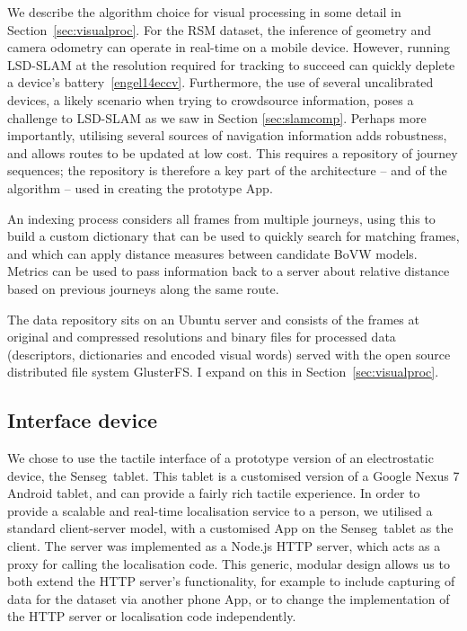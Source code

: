 We describe the algorithm choice for visual processing in some detail in Section~\ref{sec:visualproc}.  For the RSM dataset, the inference of geometry and camera odometry can operate in real-time on a mobile device. However, running LSD-SLAM at the resolution required for tracking to succeed can quickly deplete a device's battery~\ref{engel14eccv}.  Furthermore, the use of several uncalibrated devices, a likely scenario when trying to crowdsource information, poses a challenge to LSD-SLAM as we saw in Section \ref{sec:slamcomp}. Perhaps more importantly, utilising several sources of navigation information adds robustness, and allows routes to be updated at low cost. This requires a repository of journey sequences; the repository is therefore a key part of the architecture -- and of the algorithm -- used in creating the prototype App. 

An indexing process considers all frames from multiple journeys, using this to build a custom dictionary that can be used to quickly search for matching frames, and which can apply distance measures between candidate BoVW models. Metrics can be used to pass information back to a server about relative distance based on previous journeys along the same route. 

The data repository sits on an Ubuntu server and consists of the frames at original and compressed resolutions and binary files for processed data (descriptors, dictionaries and encoded visual words) served with the open source distributed file system GlusterFS. I expand on this in Section~\ref{sec:visualproc}. 

\subsection{Interface device} We chose to use the tactile interface of a prototype version of an electrostatic device, the Senseg\texttrademark\ tablet. This tablet is a customised version of a Google Nexus 7 Android tablet, and can provide a fairly rich tactile experience. In order to provide a scalable and real-time localisation service to a person, we utilised a standard client-server model, with a customised App on the Senseg\texttrademark\ tablet as the client. The server was implemented as a Node.js HTTP server, which acts as a proxy for calling the localisation code. This generic, modular design allows us to both extend the HTTP server's functionality, for example to include capturing of data for the dataset via another phone App, or to change the implementation of the HTTP server or localisation code independently.

